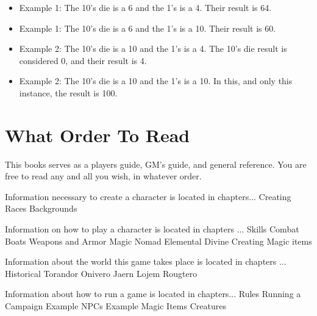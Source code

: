 \begin{itemize}
\item Example 1: The 10's die is a 6 and the 1's is a 4. Their result is 64.
\item Example 1: The 10's die is a 6 and the 1's is a 10. Their result is 60.
\item Example 2: The 10's die is a 10 and the 1's is a 4. The 10's die result is considered 0, and their result is 4.
\item Example 2: The 10's die is a 10 and the 1's is a 10. In this, and only this instance, the result is 100.
\end{itemize}


\section{What Order To Read}
This books serves as a players guide, GM's guide, and general reference. You are free to read any and all you wish, in whatever order.

Information necessary to create a character is located in chapters...
	Creating
	Races
	Backgrounds

Information on how to play a character is located in chapters ...
	Skills
	Combat
	Boats
	Weapons and Armor
	Magic
		Nomad
		Elemental
		Divine
		Creating Magic items

Information about the world this game takes place is located in chapters ...
	Historical
		Torandor
		Onivero
	Jaern
		Lojem
		Rougtero

Information about how to run a game is located in chapters...
	Rules
	Running a Campaign
	Example NPCs
	Example Magic Items
	Creatures